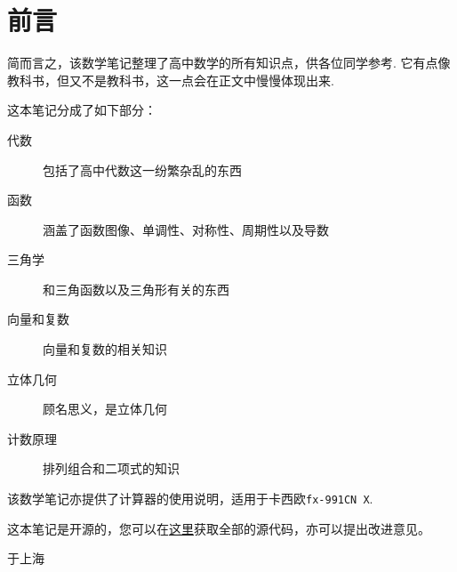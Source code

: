 \section*{前言}
简而言之，该数学笔记整理了高中数学的所有知识点，供各位同学参考. 它有点像教科书，但又不是教科书，这一点会在正文中慢慢体现出来.

这本笔记分成了如下部分：

\begin{description}
	\item[代数] 包括了高中代数这一纷繁杂乱的东西
	\item[函数] 涵盖了函数图像、单调性、对称性、周期性以及导数
	\item[三角学] 和三角函数以及三角形有关的东西
	\item[向量和复数] 向量和复数的相关知识
	\item[立体几何] 顾名思义，是立体几何
	\item[计数原理] 排列组合和二项式的知识
\end{description}

该数学笔记亦提供了计算器的使用说明，适用于卡西欧\verb|fx-991CN X|.

这本笔记是开源的，您可以在\href{https://github.com/jason-bowen-zheng/math-notes}{这里}获取全部的源代码，亦可以提出改进意见。
\hypersetup{hidelinks}

\begin{flushright}
	\date{2022年11月}于上海
\end{flushright}
